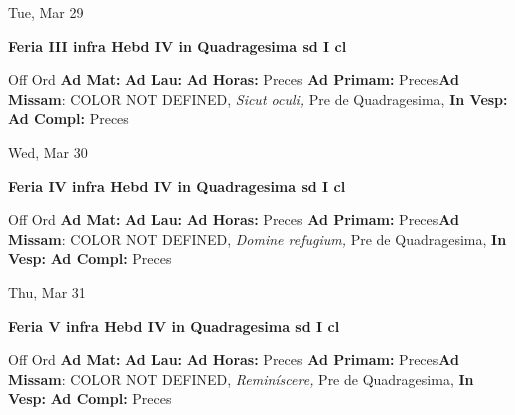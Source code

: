 \documentclass[10pt]{book}
\begin{document}
\begin{center}
\begin{minipage}{3.5in}
\vspace{2em}
\begin{center}Tue, Mar 29
\end{center}
\textbf{ \large Feria III infra Hebd IV in Quadragesima 
\textnormal{\normalsize sd I cl}}

\begin{justify}Off Ord
\textbf{Ad Mat: }
\textbf{Ad Lau: }
\textbf{Ad Horas: }Preces
\textbf{Ad Primam: }Preces\textbf{Ad Missam}: COLOR NOT DEFINED, \textit{Sicut oculi,} Pre de Quadragesima, 
\textbf{In Vesp: }
\textbf{Ad Compl: }Preces
\end{justify}
\end{minipage}
\end{center}

\begin{center}
\begin{minipage}{3.5in}
\vspace{2em}
\begin{center}Wed, Mar 30
\end{center}
\textbf{ \large Feria IV infra Hebd IV in Quadragesima 
\textnormal{\normalsize sd I cl}}

\begin{justify}Off Ord
\textbf{Ad Mat: }
\textbf{Ad Lau: }
\textbf{Ad Horas: }Preces
\textbf{Ad Primam: }Preces\textbf{Ad Missam}: COLOR NOT DEFINED, \textit{Domine refugium,} Pre de Quadragesima, 
\textbf{In Vesp: }
\textbf{Ad Compl: }Preces
\end{justify}
\end{minipage}
\end{center}

\begin{center}
\begin{minipage}{3.5in}
\vspace{2em}
\begin{center}Thu, Mar 31
\end{center}
\textbf{ \large Feria V infra Hebd IV in Quadragesima 
\textnormal{\normalsize sd I cl}}

\begin{justify}Off Ord
\textbf{Ad Mat: }
\textbf{Ad Lau: }
\textbf{Ad Horas: }Preces
\textbf{Ad Primam: }Preces\textbf{Ad Missam}: COLOR NOT DEFINED, \textit{Reminíscere,} Pre de Quadragesima, 
\textbf{In Vesp: }
\textbf{Ad Compl: }Preces
\end{justify}
\end{minipage}
\end{center}
\end{document}
